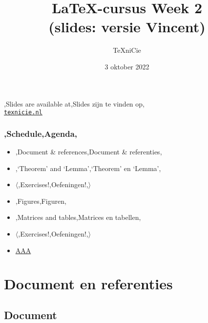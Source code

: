 \documentclass[
    dutch,
    everyoneauthor=true,
    darktheme,
    defaultSlideCollection=vincent,
    slidenames=true
]{../../cursuspresentatie}
\title[\LaTeX{}-cursus Week 2]{\LaTeX{}-cursus Week 2\\(slides: versie Vincent)}
\author{\TeX niCie}
\date{3 oktober 2022}
\begin{document}

\begin{frame}
    \titlepage
    \centering

    {\Large\lang,Slides are available at,Slides zijn te vinden op,\\
    \href{https://texnicie.nl}{\ul{\texttt{texnicie.nl}}}}
\end{frame}

\setul{1pt}{2pt}

\begin{frame}
    \frametitle{\lang,Schedule,Agenda,}
    
    \begin{itemize}
        \item \lang,Document \& references,Document \& referenties,
        \item \lang,`Theorem' and `Lemma',`Theorem' en `Lemma',
        \item $ \langle $\lang,Exercises!,Oefeningen!,$ \rangle $
        \item \lang,Figures,Figuren,
        \item \lang,Matrices and tables,Matrices en tabellen,
        \item $ \langle $\lang,Exercises!,Oefeningen!,$ \rangle $
        \item \hyperref[sec:figuren]{AAA}
    \end{itemize}
\end{frame}

\section{Document en referenties}\label{sec:document}

\hypertarget{document}{}

\subsection{Document}
\end{document}
